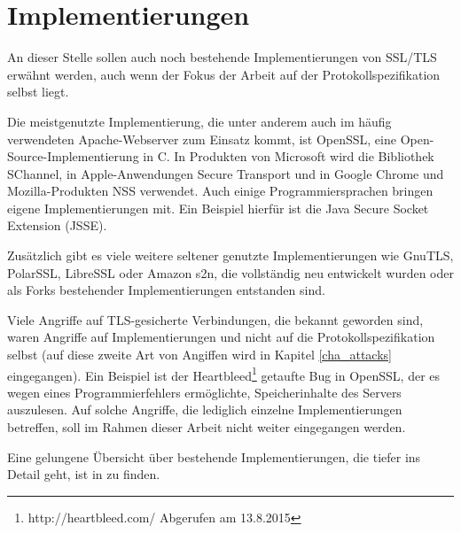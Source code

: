 

\section{Implementierungen}

An dieser Stelle sollen auch noch bestehende Implementierungen von SSL/TLS erwähnt werden, auch wenn der Fokus der Arbeit auf der Protokollspezifikation selbst liegt.

Die meistgenutzte Implementierung, die unter anderem auch im häufig verwendeten Apache-Webserver zum Einsatz kommt, ist OpenSSL, eine Open-Source-Implementierung in C. In Produkten von Microsoft wird die Bibliothek SChannel, in Apple-Anwendungen Secure Transport und in Google Chrome und Mozilla-Produkten NSS verwendet. Auch einige Programmiersprachen bringen eigene Implementierungen mit. Ein Beispiel hierfür ist die Java Secure Socket Extension (JSSE).

Zusätzlich gibt es viele weitere seltener genutzte Implementierungen wie GnuTLS, PolarSSL, LibreSSL oder Amazon s2n, die vollständig neu entwickelt wurden oder als Forks bestehender Implementierungen entstanden sind.

Viele Angriffe auf TLS-gesicherte Verbindungen, die bekannt geworden sind, waren Angriffe auf Implementierungen und nicht auf die Protokollspezifikation selbst (auf diese zweite Art von Angiffen wird in Kapitel \ref{cha_attacks} eingegangen). Ein Beispiel ist der Heartbleed\footnote{http://heartbleed.com/ Abgerufen am 13.8.2015} getaufte Bug in OpenSSL, der es wegen eines Programmierfehlers ermöglichte, Speicherinhalte des Servers auszulesen. Auf solche Angriffe, die lediglich einzelne Implementierungen betreffen, soll im Rahmen dieser Arbeit nicht weiter eingegangen werden.

Eine gelungene Übersicht über bestehende Implementierungen, die tiefer ins Detail geht, ist in \cite{meyer14} zu finden.
